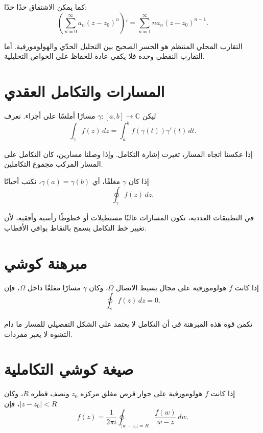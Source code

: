 كما يمكن الاشتقاق حدًا حدًا:
\[
\left(\sum_{n=0}^{\infty}a_n(z-z_0)^n\right)'
=
\sum_{n=1}^{\infty}na_n(z-z_0)^{n-1}.
\]

\begin{remark}
التقارب المحلي المنتظم هو الجسر الصحيح بين التحليل الحدّي والهولومورفية. أما التقارب النقطي وحده فلا يكفي عادة للحفاظ على الخواص التحليلية.
\end{remark}

\section{المسارات والتكامل العقدي}

ليكن \(\gamma:[a,b]\to\mathbb{C}\) مسارًا أملسًا على أجزاء. نعرف
\[
\int_\gamma f(z)\,dz
=
\int_a^b f(\gamma(t))\gamma'(t)\,dt.
\]

إذا عكسنا اتجاه المسار، تغيرت إشارة التكامل. وإذا وصلنا مسارين، كان التكامل على المسار المركب مجموع التكاملين.

\begin{definition}
إذا كان \(\gamma\) مغلقًا، أي \(\gamma(a)=\gamma(b)\)، نكتب أحيانًا
\[
\oint_\gamma f(z)\,dz.
\]
\end{definition}

في التطبيقات العددية، تكون المسارات غالبًا مستطيلات أو خطوطًا رأسية وأفقية، لأن تغيير خط التكامل يسمح بالتقاط بواقي الأقطاب.

\section{مبرهنة كوشي}

\begin{theorem}[كوشي]
\label{thm:cauchy-integral-theorem}
إذا كانت \(f\) هولومورفية على مجال بسيط الاتصال \(\Omega\)، وكان \(\gamma\) مسارًا مغلقًا داخل \(\Omega\)، فإن
\[
\oint_\gamma f(z)\,dz=0.
\]
\end{theorem}

تكمن قوة هذه المبرهنة في أن التكامل لا يعتمد على الشكل التفصيلي للمسار ما دام التشوه لا يعبر مفردات.

\section{صيغة كوشي التكاملية}

\begin{theorem}
\label{thm:cauchy-integral-formula}
إذا كانت \(f\) هولومورفية على جوار قرص مغلق مركزه \(z_0\) ونصف قطره \(R\)، وكان \(|z-z_0|<R\)، فإن
\[
f(z)
=
\frac{1}{2\pi i}
\oint_{|w-z_0|=R}
\frac{f(w)}{w-z}\,dw.
\]
\end{theorem}

